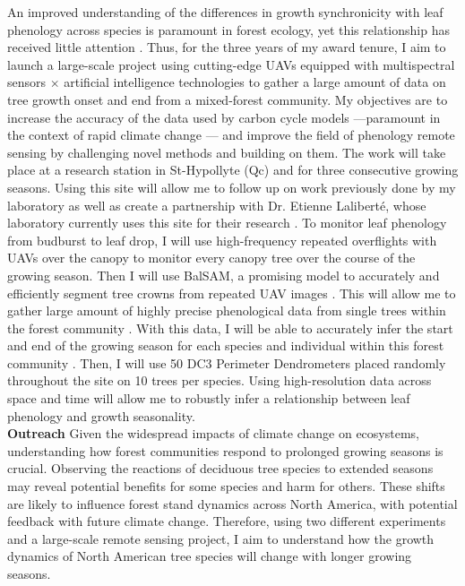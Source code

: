\documentclass[12pt]{article}
\begin{document}
An improved understanding of the differences in growth synchronicity with leaf phenology across species is paramount in forest ecology, yet this relationship has received little attention \citep{klein_coordination_2016,kramer_importance_2000}. Thus, for the three years of my award tenure, I aim to launch a large-scale project using cutting-edge UAVs equipped with multispectral sensors $\times$ artificial intelligence technologies \citep{ball_accurate_2023,teng_bringing_2025,ulku_deep_2022} to gather a large amount of data on tree growth onset and end from a mixed-forest community. My objectives are to increase the accuracy of the data used by carbon cycle models ---paramount in the context of rapid climate change \citep{richardson_climate_2013,swidrak_comparing_2013}--- and improve the field of phenology remote sensing by challenging novel methods and building on them. The work will take place at a research station in St-Hypollyte (Qc) and for three consecutive growing seasons. Using this site will allow me to follow up on work previously done by my laboratory \citep{flynn_temperature_2018} as well as create a partnership with Dr. Etienne Laliberté, whose laboratory currently uses this site for their research \citep{cloutier_influence_2024}. To monitor leaf phenology from budburst to leaf drop, I will use high-frequency repeated overflights with UAVs over the canopy to monitor every canopy tree over the course of the growing season. Then I will use BalSAM, a promising model to accurately and efficiently segment tree crowns from repeated UAV images \citep{teng_bringing_2025}. This will allow me to gather large amount of highly precise phenological data from single trees within the forest community \citep{teng_bringing_2025}. With this data, I will be able to accurately infer the start and end of the growing season for each species and individual within this forest community \citep{berra_assessing_2019,fawcett_monitoring_2021}. Then, I will use 50 DC3 Perimeter Dendrometers placed randomly throughout the site on 10 trees per species. Using high-resolution data across space and time will allow me to robustly infer a relationship between leaf phenology and growth seasonality.\\
\textbf{Outreach}
Given the widespread impacts of climate change on ecosystems, understanding how forest communities respond to prolonged growing seasons is crucial. Observing the reactions of deciduous tree species to extended seasons may reveal potential benefits for some species and harm for others. These shifts are likely to influence forest stand dynamics across North America, with potential feedback with future climate change. Therefore, using two different experiments and a large-scale remote sensing project, I aim to understand how the growth dynamics of North American tree species will change with longer growing seasons.  

\newpage

\end{document}
